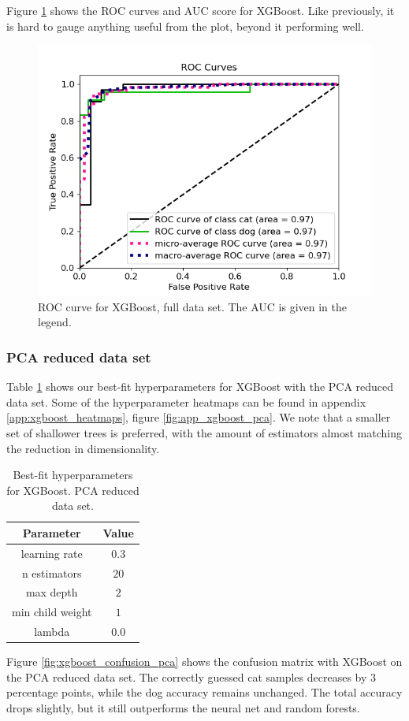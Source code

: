 \documentclass[a4paper]{article}
\begin{document}
Figure \ref{fig:xgboost_roc_nonpca} shows the ROC curves and AUC score for XGBoost. Like previously, it is hard to gauge anything useful from the plot, beyond it performing well.
\begin{figure}[H]
	\centering
	\includegraphics[scale=0.6]{../figures/xgboost/roc_nbins200_pca0_seed4155_ts0.20.png}
	\caption{ROC curve for XGBoost, full data set. The AUC is given in the legend.}
	\label{fig:xgboost_roc_nonpca}
\end{figure}	

\subsubsection{PCA reduced data set}
Table \ref{tab:best_fit_xgboost_pca} shows our best-fit hyperparameters for XGBoost with the PCA reduced data set. Some of the hyperparameter heatmaps can be found in appendix \ref{app:xgboost_heatmaps}, figure \ref{fig:app_xgboost_pca}. We note that a smaller set of shallower trees is preferred, with the amount of estimators almost matching the reduction in dimensionality.

\begin{table}[H]
  \centering
  \caption{Best-fit hyperparameters for XGBoost. PCA reduced data set.}
  \label{tab:best_fit_xgboost_pca}
  \begin{tabular}{c|c}
    \hline\hline
    Parameter & Value\\\hline
    learning rate  & $0.3$\\
    n estimators &  $20$\\
    max depth &  $2$\\
    min child weight & $1$ \\
    lambda & $0.0$
    \end{tabular}
\end{table}
Figure \ref{fig:xgboost_confusion_pca} shows the confusion matrix with XGBoost on the PCA reduced data set. The correctly guessed cat samples decreases by 3 percentage points, while the dog accuracy remains unchanged. The total accuracy drops slightly, but it still outperforms the neural net and random forests.
\end{document}
